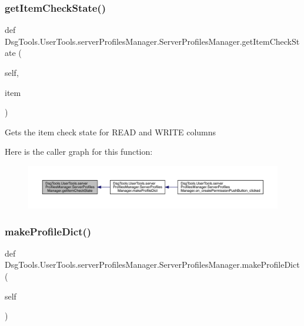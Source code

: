 \subsubsection{\texorpdfstring{get\+Item\+Check\+State()}{getItemCheckState()}}
{\footnotesize\ttfamily def Dsg\+Tools.\+User\+Tools.\+server\+Profiles\+Manager.\+Server\+Profiles\+Manager.\+get\+Item\+Check\+State (\begin{DoxyParamCaption}\item[{}]{self,  }\item[{}]{item }\end{DoxyParamCaption})}

\begin{DoxyVerb}Gets the item check state for READ and WRITE columns
\end{DoxyVerb}
 Here is the caller graph for this function\+:
\nopagebreak
\begin{figure}[H]
\begin{center}
\leavevmode
\includegraphics[width=350pt]{class_dsg_tools_1_1_user_tools_1_1server_profiles_manager_1_1_server_profiles_manager_a8ba7fe7746fabee4c8b4f726c063e1f0_icgraph}
\end{center}
\end{figure}
\mbox{\label{class_dsg_tools_1_1_user_tools_1_1server_profiles_manager_1_1_server_profiles_manager_aad84d9e38d3a08eb25942bacd8c15136}} 
\subsubsection{\texorpdfstring{make\+Profile\+Dict()}{makeProfileDict()}}
{\footnotesize\ttfamily def Dsg\+Tools.\+User\+Tools.\+server\+Profiles\+Manager.\+Server\+Profiles\+Manager.\+make\+Profile\+Dict (\begin{DoxyParamCaption}\item[{}]{self }\end{DoxyParamCaption})}

